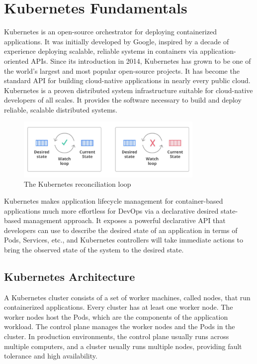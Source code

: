 \section{Kubernetes Fundamentals}


Kubernetes is an open-source orchestrator for deploying containerized
applications. It was initially developed by Google, inspired by a decade of
experience deploying scalable, reliable systems in containers via
application-oriented APIs. Since its introduction in 2014, Kubernetes has grown
to be one of the world's largest and most popular open-source projects. It has
become the standard API for building cloud-native applications in nearly every
public cloud. Kubernetes is a proven distributed system infrastructure suitable
for cloud-native developers of all scales. It provides the software necessary to
build and deploy reliable, scalable distributed systems.

\begin{figure}
	\centering
	\includegraphics[width=0.8\textwidth]{resources/declarative.jpg}
	\caption{The Kubernetes reconciliation loop}
\end{figure}

Kubernetes makes application lifecycle management for container-based
applications much more effortless for DevOps via a declarative desired
state-based management approach. It exposes a powerful declarative API that
developers can use to describe the desired state of an application in terms of
Pods, Services, etc., and Kubernetes controllers will take immediate actions to
bring the observed state of the system to the desired state.

\subsection{Kubernetes Architecture}
A Kubernetes cluster consists of a set of worker machines, called nodes, that
run containerized applications. Every cluster has at least one worker node. The
worker nodes host the Pods, which are the components of the application
workload. The control plane manages the worker nodes and the Pods in the
cluster. In production environments, the control plane usually runs across
multiple computers, and a cluster usually runs multiple nodes, providing fault
tolerance and high availability.

